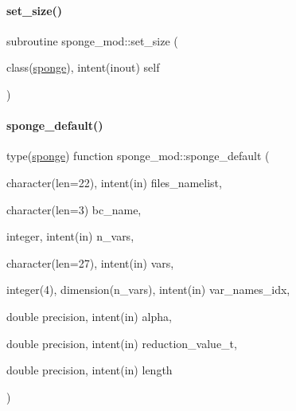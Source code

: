 \mbox{\label{namespacesponge__mod_a9c570885a952e752d04ae3847b2b8ad8}} 
\paragraph{\texorpdfstring{set\+\_\+size()}{set\_size()}}
{\footnotesize\ttfamily subroutine sponge\+\_\+mod\+::set\+\_\+size (\begin{DoxyParamCaption}\item[{class(\mbox{\hyperlink{structsponge__mod_1_1sponge}{sponge}}), intent(inout)}]{self }\end{DoxyParamCaption})\hspace{0.3cm}{\ttfamily [private]}}

\mbox{\label{namespacesponge__mod_a8d33aa09da835a9da7fb6553c521e2cb}} 
\paragraph{\texorpdfstring{sponge\+\_\+default()}{sponge\_default()}}
{\footnotesize\ttfamily type(\mbox{\hyperlink{structsponge__mod_1_1sponge}{sponge}}) function sponge\+\_\+mod\+::sponge\+\_\+default (\begin{DoxyParamCaption}\item[{character(len=22), intent(in)}]{files\+\_\+namelist,  }\item[{character(len=3)}]{bc\+\_\+name,  }\item[{integer, intent(in)}]{n\+\_\+vars,  }\item[{character(len=27), intent(in)}]{vars,  }\item[{integer(4), dimension(n\+\_\+vars), intent(in)}]{var\+\_\+names\+\_\+idx,  }\item[{double precision, intent(in)}]{alpha,  }\item[{double precision, intent(in)}]{reduction\+\_\+value\+\_\+t,  }\item[{double precision, intent(in)}]{length }\end{DoxyParamCaption})\hspace{0.3cm}{\ttfamily [private]}}

